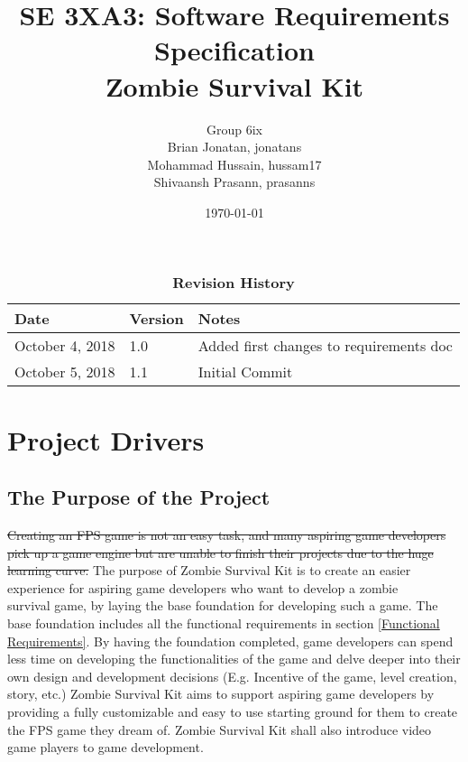 \documentclass[12pt, titlepage]{article}
\title{SE 3XA3: Software Requirements Specification\\Zombie Survival Kit}
\author{{\color{magenta} Group 6ix}
		\\ Brian Jonatan, jonatans
		\\ Mohammad Hussain, hussam17
		\\ Shivaansh Prasann, prasanns
}
\date{\today}
\begin{document}
\maketitle

\tableofcontents
\listoftables
\listoffigures

\begin{table}[bp]
\caption{\bf Revision History}
\begin{tabularx}{\textwidth}{p{3cm}p{2cm}X}
\toprule {\bf Date} & {\bf Version} & {\bf Notes}\\
\midrule
October 4, 2018 & 1.0 & Added first changes to requirements doc\\
October 5, 2018 & 1.1 & Initial Commit\\
\bottomrule
\end{tabularx}
\end{table}

\newpage



\section{Project Drivers}

\subsection{The Purpose of the Project}
\sout{Creating an FPS game is not an easy task, and many aspiring game developers pick up a game engine but are unable to finish their projects due to the huge learning curve.}
{\color{magenta} The purpose of Zombie Survival Kit is to create an easier experience for aspiring game developers who want to develop a zombie\\ survival game, by laying the base foundation for developing such a game. The base foundation includes all the functional requirements in section \ref{Functional Requirements}. By having the foundation completed, game developers can spend less time on developing the functionalities of the game and delve deeper into their own design  and development decisions (E.g. Incentive of the game, level creation, story, etc.)}
\newline
\newline
Zombie Survival Kit aims to support aspiring game developers by providing a fully customizable and easy to use starting ground for them to create the FPS game they dream of. Zombie Survival Kit shall also introduce video game players to game development.
\end{document}
